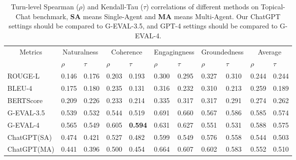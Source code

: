 \begin{table}[t]
\caption{Turn-level Spearman ($\rho$) and Kendall-Tau ($\tau$) correlations of different methods on Topical-Chat benchmark, \textbf{SA} means Single-Agent and \textbf{MA} means Multi-Agent. Our ChatGPT settings should be compared to G-EVAL-3.5, and GPT-4 settings should be compared to G-EVAL-4. }
\label{tab:topical_chat_results}
\begin{center}
\begin{tabularx}{\textwidth}{p{2cm} | X | X | X | X | X | X | X | X | X | X}
\hline
\multicolumn{1}{c}{\multirow{2}{*}{Metrics}} & \multicolumn{2}{c}{Naturalness} & \multicolumn{2}{c}{Coherence} & \multicolumn{2}{c}{Engagingness} & \multicolumn{2}{c}{Groundedness} & \multicolumn{2}{c}{Average} \\
\multicolumn{1}{c}{} & $\rho$ & $\tau$ & $\rho$ & $\tau$ & $\rho$ & $\tau$ & $\rho$ & $\tau$ & $\rho$ & $\tau$\\ \hline
ROUGE-L                                      & 0.146          & 0.176          & 0.203         & 0.193         & 0.300             & 0.295          & 0.327           & 0.310           & 0.244        & 0.244       \\
BLEU-4                                       & 0.175          & 0.180           & 0.235         & 0.131         & 0.316           & 0.232          & 0.310            & 0.213          & 0.259        & 0.189        \\
BERTScore                                    & 0.209          & 0.226          & 0.233         & 0.214         & 0.335           & 0.317          & 0.317           & 0.291          & 0.274       & 0.262        \\
\hline
G-EVAL-3.5                                   & 0.539          & 0.532          & 0.544         & 0.519         & 0.691           & 0.660           & 0.567           & 0.586          & 0.585      & 0.574      \\
G-EVAL-4                                     & 0.565          & 0.549          & 0.605         & \textbf{0.594}         & 0.631           & 0.627          & 0.551           & 0.531          & 0.588        & 0.575      \\
\hline
ChatGPT(SA)                       & 0.474          & 0.421          & 0.527         & 0.482         & 0.599           & 0.549          & 0.576           & 0.558          & 0.544        & 0.503       \\
ChatGPT(MA)                        & 0.441          & 0.396          & 0.500           & 0.454         & 0.664           & 0.607          & 0.602           & 0.583          & 0.552      & 0.510         \\

\end{tabularx}
\end{center}
\end{table}
